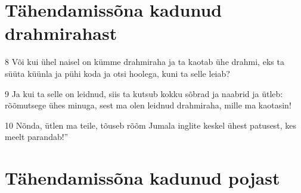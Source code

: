 \section*{Tähendamissõna kadunud drahmirahast}

\par 8 Või kui ühel naisel on kümme drahmiraha ja ta kaotab ühe drahmi, eks ta süüta küünla ja pühi koda ja otsi hoolega, kuni ta selle leiab?
\par 9 Ja kui ta selle on leidnud, siis ta kutsub kokku sõbrad ja naabrid ja ütleb: rõõmutsege ühes minuga, sest ma olen leidnud drahmiraha, mille ma kaotasin!
\par 10 Nõnda, ütlen ma teile, tõuseb rõõm Jumala inglite keskel ühest patusest, kes meelt parandab!”

\section*{Tähendamissõna kadunud pojast}

